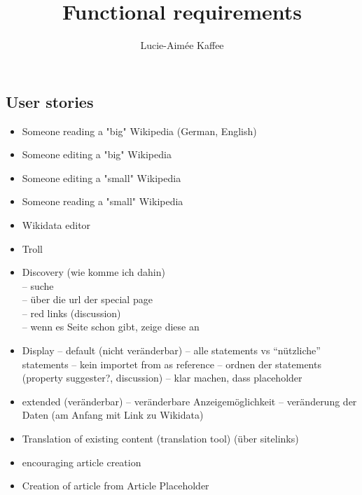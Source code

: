 \documentclass[11pt]{article}
\title {{Functional requirements}}
\author {Lucie-Aim\'{e}e Kaffee}
\date{}
\begin{document}
\subsection{User stories}

\begin{itemize}
\item Someone reading a "big" Wikipedia (German, English)
\item Someone editing a "big" Wikipedia
\item Someone editing a "small" Wikipedia
\item Someone reading a "small" Wikipedia 
\item Wikidata editor
\item Troll

\item Discovery (wie komme ich dahin)\\
-- suche\\
-- über die url der special page\\
-- red links (discussion)\\
-- wenn es Seite schon gibt, zeige diese an\\
\item Display -- default (nicht veränderbar)
-- alle statements vs “nützliche” statements
-- kein importet from as reference
-- ordnen der statements (property suggester?, discussion)
-- klar machen, dass placeholder
\item extended (veränderbar)
-- veränderbare Anzeigemöglichkeit
-- veränderung der Daten (am Anfang mit Link zu Wikidata)
\item Translation of existing content (translation tool) (über sitelinks)
\item encouraging article creation 
\item Creation of article from Article Placeholder
\end{itemize}
\end{document}
